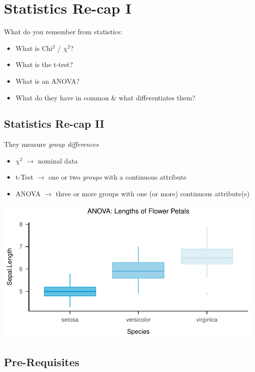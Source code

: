 \documentclass[
]{book}
\providecommand{\tightlist}{%
  \setlength{\itemsep}{0pt}\setlength{\parskip}{0pt}}
\begin{document}
\section{\texorpdfstring{Statistics Re-cap I}{Statistics Re-cap  I}}\label{statistics-re-cap-i}

What do you remember from statistics:

\begin{itemize}
\tightlist
\item
  What is Chi\(^2\) / \(\chi^2\)?
\item
  What is the t-test?
\item
  What is an ANOVA?
\item
  What do they have in common \& what differentiates them?
\end{itemize}

\subsection{\texorpdfstring{Statistics Re-cap II}{Statistics Re-cap  II}}\label{statistics-re-cap-ii}

They measure \emph{group differences}

\begin{itemize}
\tightlist
\item
  \(\chi^2\) \(\rightarrow\) nominal data
\item
  t-Test \(\rightarrow\) one or two \emph{groups} with a continuous attribute
\item
  ANOVA \(\rightarrow\) three or more groups with one (or more) continuous attribute(s)
\end{itemize}

\includegraphics{_main_files/figure-html/unnamed-chunk-54-1.pdf}

\subsection{Pre-Requisites}\label{pre-requisites}
\end{document}
